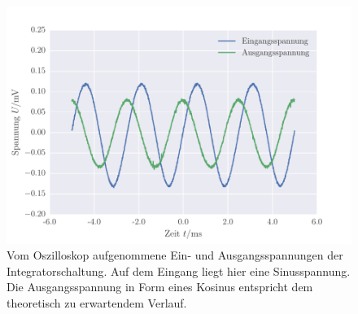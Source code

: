 \FloatBarrier
\begin{figure}[!h]
\centering
\includegraphics[scale=0.75]{../Grafiken/Integrator_Oszilloskop_Sinus.pdf}
\caption{Vom Oszilloskop aufgenommene Ein- und Ausgangsspannungen der Integratorschaltung. Auf dem Eingang
	liegt hier eine Sinusspannung. Die Ausgangsspannung in Form eines Kosinus entspricht dem theoretisch
	zu erwartendem Verlauf.
	 \label{fig:integrator_oszilloskop_sinus}}
\end{figure}
\FloatBarrier